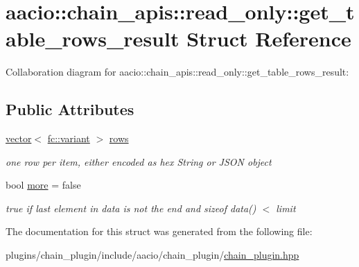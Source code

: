 \hypertarget{structaacio_1_1chain__apis_1_1read__only_1_1get__table__rows__result}{}\section{aacio\+:\+:chain\+\_\+apis\+:\+:read\+\_\+only\+:\+:get\+\_\+table\+\_\+rows\+\_\+result Struct Reference}
\label{structaacio_1_1chain__apis_1_1read__only_1_1get__table__rows__result}


Collaboration diagram for aacio\+:\+:chain\+\_\+apis\+:\+:read\+\_\+only\+:\+:get\+\_\+table\+\_\+rows\+\_\+result\+:
\subsection*{Public Attributes}
\begin{DoxyCompactItemize}
\item 
\mbox{\label{structaacio_1_1chain__apis_1_1read__only_1_1get__table__rows__result_ab86333099f7eb9d784eff061e17c820c}} 
\mbox{\hyperlink{classstd_1_1vector}{vector}}$<$ \mbox{\hyperlink{classfc_1_1variant}{fc\+::variant}} $>$ \mbox{\hyperlink{structaacio_1_1chain__apis_1_1read__only_1_1get__table__rows__result_ab86333099f7eb9d784eff061e17c820c}{rows}}
\begin{DoxyCompactList}\small\item\em one row per item, either encoded as hex String or J\+S\+ON object \end{DoxyCompactList}\item 
\mbox{\label{structaacio_1_1chain__apis_1_1read__only_1_1get__table__rows__result_a4f3c1407e29222f729b4331cc5f7006d}} 
bool \mbox{\hyperlink{structaacio_1_1chain__apis_1_1read__only_1_1get__table__rows__result_a4f3c1407e29222f729b4331cc5f7006d}{more}} = false
\begin{DoxyCompactList}\small\item\em true if last element in data is not the end and sizeof data() $<$ limit \end{DoxyCompactList}\end{DoxyCompactItemize}


The documentation for this struct was generated from the following file\+:\begin{DoxyCompactItemize}
\item 
plugins/chain\+\_\+plugin/include/aacio/chain\+\_\+plugin/\mbox{\hyperlink{chain__plugin_8hpp}{chain\+\_\+plugin.\+hpp}}\end{DoxyCompactItemize}
